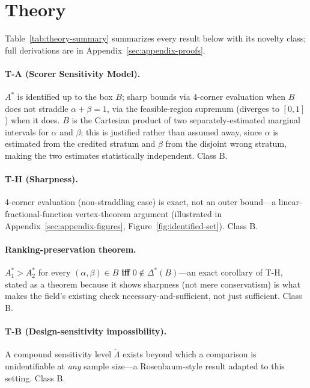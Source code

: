 \section{Theory}
\label{sec:theory}

Table~\ref{tab:theory-summary} summarizes every result below with its
novelty class; full derivations are in Appendix~\ref{sec:appendix-proofs}.

\paragraph{T-A (Scorer Sensitivity Model).} $A^\ast$ is identified up to the
box $B$; sharp bounds via 4-corner evaluation when $B$ does not straddle
$\alpha+\beta=1$, via the feasible-region supremum (diverges to $[0,1]$)
when it does. $B$ is the Cartesian product of two separately-estimated
marginal intervals for $\alpha$ and $\beta$; this is justified rather than
assumed away, since $\alpha$ is estimated from the credited stratum and
$\beta$ from the disjoint wrong stratum, making the two estimates
statistically independent. Class B.

\paragraph{T-H (Sharpness).} 4-corner evaluation (non-straddling case) is
exact, not an outer bound---a linear-fractional-function vertex-theorem
argument (illustrated in Appendix~\ref{sec:appendix-figures},
Figure~\ref{fig:identified-set}). Class B.

\paragraph{Ranking-preservation theorem.} $A_1^\ast > A_2^\ast$ for every
$(\alpha,\beta) \in B$ \textbf{iff} $0 \notin \Delta^\ast(B)$---an exact
corollary of T-H, stated as a theorem because it shows sharpness (not mere
conservatism) is what makes the field's existing 
check necessary-and-sufficient, not just sufficient. Class B.

\paragraph{T-B (Design-sensitivity impossibility).} A compound sensitivity
level $\tilde{\Lambda}$ exists beyond which a comparison is unidentifiable
at \emph{any} sample size---a Rosenbaum-style result
\citep{rosenbaum2004design} adapted to this setting. Class B.

